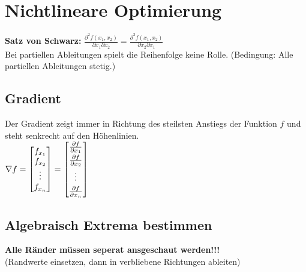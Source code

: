 


\section{Nichtlineare Optimierung}

\textbf{Satz von Schwarz:} $\frac{\partial^2 f(x_1, x_2)}{\partial x_1 \partial x_2} = \frac{\partial^2 f(x_1, x_2)}{\partial x_2 \partial x_1}$\\
Bei partiellen Ableitungen spielt die Reihenfolge keine Rolle. (Bedingung: Alle partiellen Ableitungen stetig.)

\begin{minipage}[t]{0.4\linewidth}
\subsection{Gradient}
Der Gradient zeigt immer in Richtung des steilsten Anstiegs der Funktion $f$ und steht senkrecht auf den Höhenlinien.\\


$\nabla f =\begin{bmatrix}
f_{x_1}\\
f_{x_2}\\
\vdots\\
f_{x_n}
\end{bmatrix}=\begin{bmatrix}
\frac{\partial f}{\partial x_1}\\[0.1cm]
\frac{\partial f}{\partial x_2}\\[0.1cm]
\vdots\\[0.1cm]
\frac{\partial f}{\partial x_n}
\end{bmatrix}$
\end{minipage}
\hfill
\begin{minipage}[t]{0.58\linewidth}
	\subsection{Algebraisch Extrema bestimmen}
	\textbf{Alle Ränder müssen seperat ansgeschaut werden!!!}\\
	(Randwerte einsetzen, dann in verbliebene Richtungen ableiten)\\
	
	\\
\end{minipage}



